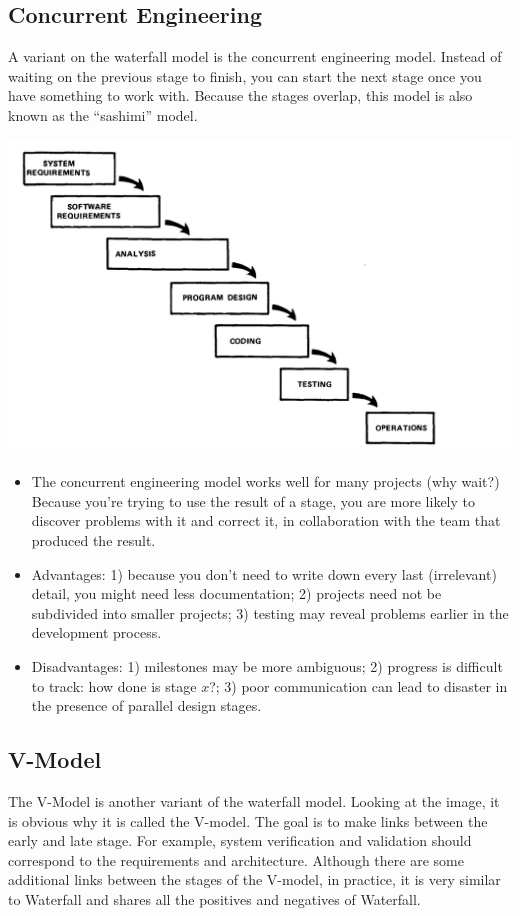 \subsection*{Concurrent Engineering}
A variant on the waterfall model is the concurrent engineering model.
Instead of waiting on the previous stage to finish, you can start the
next stage once you have something to work with. Because the stages
overlap, this model is also known as the ``sashimi'' model.

\begin{center}
\includegraphics[width=.6\textwidth]{images/concurrent-engineering}
\end{center}

\begin{itemize}
\item The concurrent engineering model works well for many projects (why wait?)
Because you're trying to use the result of a stage, you are more likely to
discover problems with it and correct it, in collaboration with the team
that produced the result.
\item Advantages: 1) because you don't need to write down every last
  (irrelevant) detail, you might need less documentation; 2) projects need
  not be subdivided into smaller projects; 3) testing may reveal problems
  earlier in the development process.
\item Disadvantages: 1) milestones may be more ambiguous; 2) progress
  is difficult to track: how done is stage $x$?; 3) poor
  communication can lead to disaster in the presence of parallel design
  stages.
\end{itemize}


\subsection*{V-Model}
The V-Model is another variant of the waterfall model. Looking at the image, it is obvious why it is called the V-model. The goal is to make links between the early and late stage. For example, system verification and validation should correspond to the requirements and architecture. Although there are some additional links between the stages of the V-model, in practice, it is very similar to Waterfall and shares all the positives and negatives of Waterfall.

